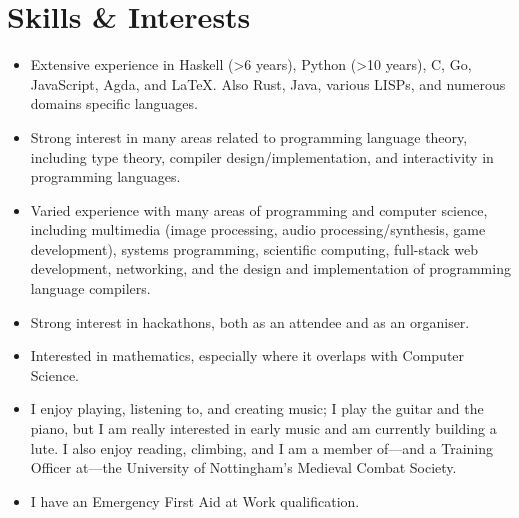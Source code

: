 \documentclass[12pt]{article}
\begin{document}
\section*{Skills \& Interests}
\begin{itemize}
	\item Extensive experience in Haskell (>6 years), Python (>10 years), C, Go, JavaScript, Agda, and \LaTeX. Also Rust, Java, various LISPs, and numerous domains specific languages.
	\item Strong interest in many areas related to programming language theory, including type theory, compiler design/implementation, and interactivity in programming languages.
	\item Varied experience with many areas of programming and computer science, including multimedia (image processing, audio processing/synthesis, game development), systems programming, scientific computing, full-stack web development, networking, and the design and implementation of programming language compilers.
	\item Strong interest in hackathons, both as an attendee and as an organiser.
	\item Interested in mathematics, especially where it overlaps with Computer Science.
	\item I enjoy playing, listening to, and creating music; I play the guitar and the piano, but I am really interested in early music and am currently building a lute. I also enjoy reading, climbing, and I am a member of---and a Training Officer at---the University of Nottingham's Medieval Combat Society.
	\item I have an Emergency First Aid at Work qualification.
\end{itemize}
\end{document}
